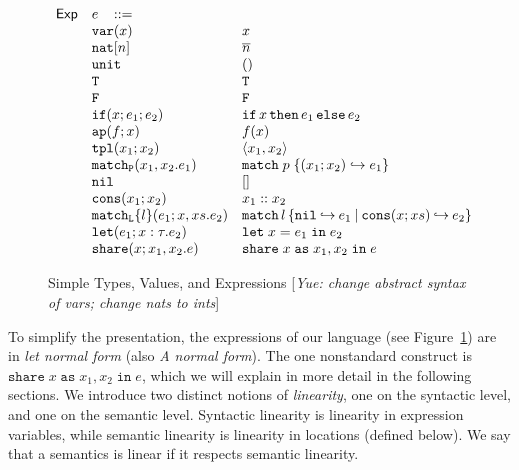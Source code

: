 \documentclass{easychair}
\newcommand{\ms}[1]{\ensuremath{\mathsf{#1}}}
\newcommand{\irl}[1]{\mathtt{#1}}
\newcommand{\paircaseabt}[4]{\irl{match_P}(#2,#3.#4)}
\newcommand{\paircasecst}[4]{\irl{match} \; #1\; \{(#2;#3) \hookrightarrow #4\}}
\newcommand{\sharecst}[4]{\irl{share}\;#1\;\irl{as}\;#2,#3\;\irl{in}\;#4}
\newcommand{\shareabt}[4]{\irl{share}(#1;#2,#3.#4)}
\newcommand{\yue}[1]{{\color{blue} [\emph{Yue: #1}]}}
\theoremstyle{definition}
\begin{document}
\begin{figure}[t!]
\begin{minipage}[t]{0.59\linewidth}
\[\begin{array}{r l l l}
\ms{Exp}
        & e   \,\,\,\,\, ::= \\
 	& \irl{var}(x)                                			& x 											\\	
  & \irl{nat}[n]							& \numeral{n}											\\	
  & \irl{unit}							& ()											\\	
  & \irl{T}							& \irl{T}											\\	
  & \irl{F}	   					& \irl{F}											\\	
  & \ifexabt{x}{e_1}{e_2} & \ifexcst{x}{e_1}{e_2} \\ 
  & \irl{ap}(f;x) 					& \appcst{f}{x} 									\\	
  & \irl{tpl}(x_1;x_2)     	& \pairexcst{x_1}{x_2}                								\\	
 	& \paircaseabt{p}{x_1}{x_2}{e_1}					& \paircasecst{p}{x_1}{x_2}{e_1}   \\	
 	& \nilexabt					& []   									\\	
 	& \consexabt{x_1}{x_2}					& x_1::x_2   									\\	
 	& \listcaseexabt{l}{e_1}{x}{xs}{e_2}					& \listcaseexcst{l}{e_1}{x}{xs}{e_2}   \\	
  & \irl{let}(e_1; x : \tau.e_2)			& \irl{let}\; x = e_1 \; \irl{in}\; e_2   \\	
  & \shareabt{x}{x_1}{x_2}{e} &\sharecst{x}{x_1}{x_2}{e}\\ 
\end{array}
\]
\end{minipage}

\caption{Simple Types, Values, and Expressions \yue{change abstract syntax of vars; change nats to ints}}
\label{fig:exp}
\end{figure}

To simplify the presentation, the expressions of our language (see Figure~\ref{fig:exp}) are in \emph{let normal form} (also \emph{A normal form}).
The one nonstandard construct is $\sharecst{x}{x_1}{x_2}{e}$, which we will explain in more 
detail in the following sections. We introduce two distinct notions of \emph{linearity}, one on 
the syntactic level, and one on the semantic level. Syntactic linearity is linearity in 
expression variables, while semantic linearity is linearity in locations (defined below).
We say that a semantics is linear if it respects semantic linearity.
\end{document}
